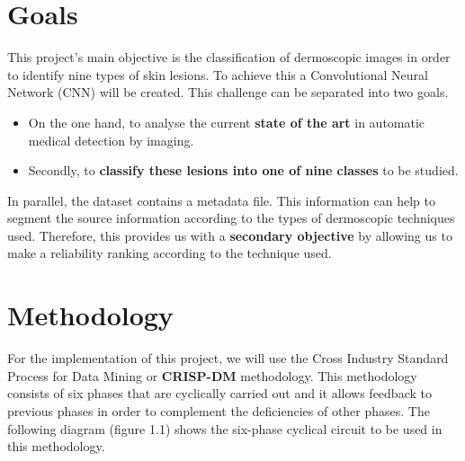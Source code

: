 \section{Goals}


This project's main objective is the classification of dermoscopic images in order to identify nine types of skin lesions. To achieve this a Convolutional Neural Network (CNN) will be created. This challenge can be separated into two goals.

\begin{itemize}
    \item On the one hand, to analyse the current \textbf{state of the art} in automatic medical detection by imaging.
    \item Secondly, to \textbf{classify these lesions into one of nine classes} to be studied.
\end{itemize}

In parallel, the dataset contains a metadata file. This information can help to segment the source information according to the types of dermoscopic techniques used. Therefore, this provides us with a \textbf{secondary objective} by allowing us to make a reliability ranking according to the technique used. 


\section{Methodology}


For the implementation of this project, we will use the Cross Industry Standard Process for Data Mining or \textbf{CRISP-DM} methodology. This methodology consists of six phases that are cyclically carried out and it allows feedback to previous phases in order to complement the deficiencies of other phases. The following diagram (figure 1.1) shows the six-phase cyclical circuit to be used in this methodology.

